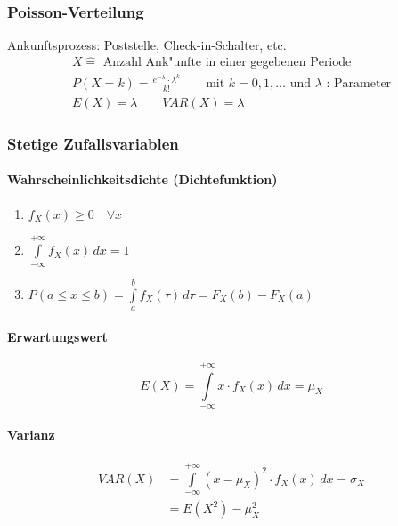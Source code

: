 \subsubsection{Poisson-Verteilung}
Ankunftsprozess: Poststelle, Check-in-Schalter, etc.
\begin{gather*}
	X \hat{=}\text{ Anzahl Ank"unfte in einer gegebenen Periode} \\
	P(X=k)=\frac{e^{-\lambda}\cdot\lambda^k}{k!}\qquad\text{mit }k=0,1,\ldots\text{ und }\lambda\text{ : Parameter} \\
	E(X) = \lambda\qquad VAR(X)=\lambda
\end{gather*}

\subsubsection{Stetige Zufallsvariablen}
\paragraph{Wahrscheinlichkeitsdichte (Dichtefunktion)}
\begin{enumerate}
	\item $f_X(x)\geq 0\quad\forall x$
	\item $\int\limits_{-\infty}^{+\infty}f_X(x)\,dx=1$
	\item $P(a\leq x\leq b) = \int\limits_a^b f_X(\tau)\,d\tau=F_X(b)-F_X(a)$
\end{enumerate}

\paragraph{Erwartungswert}
\begin{equation}
	E(X)=\int\limits_{-\infty}^{+\infty}x\cdot f_X(x)\,dx = \mu_X
\end{equation}

\paragraph{Varianz}
\begin{align}
	VAR(X) &= \int\limits_{-\infty}^{+\infty}(x-\mu_X)^2\cdot f_X(x)\,dx = \sigma_X \\
		&= E(X^2)-\mu^2_X
\end{align}

